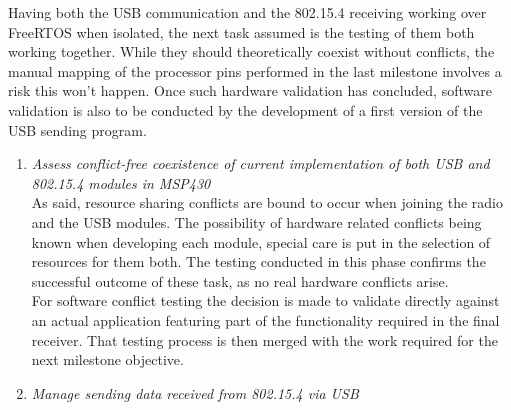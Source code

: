 		Having both the USB communication and the 802.15.4 receiving working over FreeRTOS when isolated, the next task assumed is the testing of them both working together. While they should theoretically coexist without conflicts, the manual mapping of the processor pins performed in the last milestone involves a risk this won't happen. Once such hardware validation has concluded, software validation is also to be conducted by the development of a first version of the USB sending program.

		\begin{enumerate}
		\item\emph{Assess conflict-free coexistence of current implementation of both USB and 802.15.4 modules in MSP430}\\

		As said, resource sharing conflicts are bound to occur when joining the radio and the USB modules. The possibility of hardware related conflicts being known when developing each module, special care is put in the selection of resources for them both. The testing conducted in this phase confirms the successful outcome of these task, as no real hardware conflicts arise.\\

		For software conflict testing the decision is made to validate directly against an actual application featuring part of the functionality required in the final receiver. That testing process is then merged with the work required for the next milestone objective.\\


		\item\emph{Manage sending data received from 802.15.4 via USB}\\


\end{enumerate}
